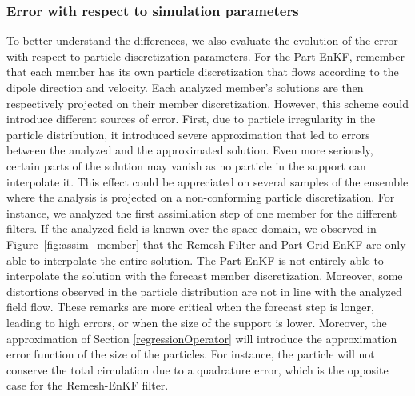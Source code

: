 \subsubsection{Error with respect to simulation parameters}

To better understand the differences, we also evaluate the evolution of the error with respect to particle discretization parameters. For the Part-EnKF, remember that each member has its own particle discretization that flows according to the dipole direction and velocity. Each analyzed member's solutions are then respectively projected on their member discretization. However, this scheme could introduce different sources of error. First, due to particle irregularity in the particle distribution, it introduced severe approximation that led to errors between the analyzed and the approximated solution. Even more seriously, certain parts of the solution may vanish as no particle in the support can interpolate it. This effect could be appreciated on several samples of the ensemble where the analysis is projected on a non-conforming particle discretization. For instance, we analyzed the first assimilation step of one member for the different filters. If the analyzed field is known over the space domain, we observed in Figure~\ref{fig:assim_member} that the Remesh-Filter and Part-Grid-EnKF are only able to interpolate the entire solution. The Part-EnKF is not entirely able to interpolate the solution with the forecast member discretization.
Moreover, some distortions observed in the particle distribution are not in line with the analyzed field flow. These remarks are more critical when the forecast step is longer, leading to high errors, or when the size of the support is lower. Moreover, the approximation of Section \ref{regressionOperator} will introduce the approximation error function of the size of the particles. For instance, the particle will not conserve the total circulation due to a quadrature error, which is the opposite case for the Remesh-EnKF filter.

